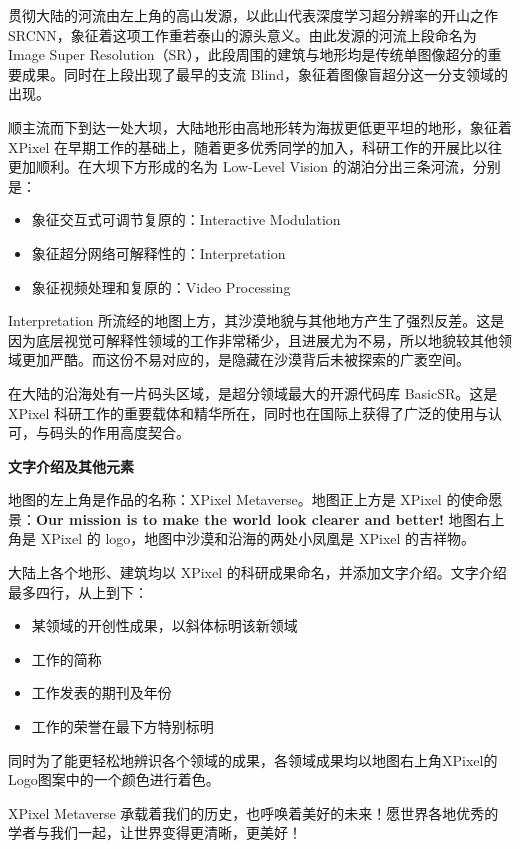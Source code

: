 \documentclass[../main.tex]{subfiles}
\begin{document}
贯彻大陆的河流由左上角的高山发源，以此山代表深度学习超分辨率的开山之作 SRCNN，象征着这项工作重若泰山的源头意义。由此发源的河流上段命名为 Image Super Resolution（SR），此段周围的建筑与地形均是传统单图像超分的重要成果。同时在上段出现了最早的支流 Blind，象征着图像盲超分这一分支领域的出现。

顺主流而下到达一处大坝，大陆地形由高地形转为海拔更低更平坦的地形，象征着 XPixel 在早期工作的基础上，随着更多优秀同学的加入，科研工作的开展比以往更加顺利。在大坝下方形成的名为 Low-Level Vision 的湖泊分出三条河流，分别是：
\begin{itemize}
    \item 象征交互式可调节复原的：Interactive Modulation
    \item 象征超分网络可解释性的：Interpretation
    \item 象征视频处理和复原的：Video Processing
\end{itemize}

Interpretation 所流经的地图上方，其沙漠地貌与其他地方产生了强烈反差。这是因为底层视觉可解释性领域的工作非常稀少，且进展尤为不易，所以地貌较其他领域更加严酷。而这份不易对应的，是隐藏在沙漠背后未被探索的广袤空间。

在大陆的沿海处有一片码头区域，是超分领域最大的开源代码库 BasicSR。这是 XPixel 科研工作的重要载体和精华所在，同时也在国际上获得了广泛的使用与认可，与码头的作用高度契合。

\textbf{文字介绍及其他元素}

地图的左上角是作品的名称：XPixel Metaverse。地图正上方是 XPixel 的使命愿景：\textbf{Our mission is to make the world look clearer and better!} 地图右上角是 XPixel 的 logo，地图中沙漠和沿海的两处小凤凰是 XPixel 的吉祥物。

大陆上各个地形、建筑均以 XPixel 的科研成果命名，并添加文字介绍。文字介绍最多四行，从上到下：

\begin{itemize}
    \item 某领域的开创性成果，以斜体标明该新领域
    \item 工作的简称
    \item 工作发表的期刊及年份
    \item 工作的荣誉在最下方特别标明
\end{itemize}

同时为了能更轻松地辨识各个领域的成果，各领域成果均以地图右上角XPixel的Logo图案中的一个颜色进行着色。

\vspace{0.5cm}
XPixel Metaverse 承载着我们的历史，也呼唤着美好的未来！愿世界各地优秀的学者与我们一起，让世界变得更清晰，更美好！
\end{document}
